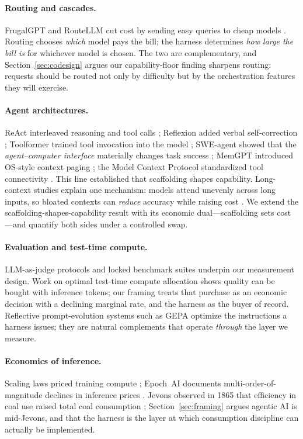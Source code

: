 \documentclass[11pt]{article}
\begin{document}
\paragraph{Routing and cascades.} FrugalGPT and RouteLLM cut cost by sending easy queries to cheap models \cite{frugalgpt,routellm}. Routing chooses \emph{which} model pays the bill; the harness determines \emph{how large the bill is} for whichever model is chosen. The two are complementary, and Section~\ref{sec:codesign} argues our capability-floor finding sharpens routing: requests should be routed not only by difficulty but by the orchestration features they will exercise.

\paragraph{Agent architectures.} ReAct interleaved reasoning and tool calls \cite{react}; Reflexion added verbal self-correction \cite{reflexion}; Toolformer trained tool invocation into the model \cite{toolformer}; SWE-agent showed that the \emph{agent--computer interface} materially changes task success \cite{sweagent}; MemGPT introduced OS-style context paging \cite{memgpt}; the Model Context Protocol standardized tool connectivity \cite{mcp}. This line established that scaffolding shapes capability. Long-context studies explain one mechanism: models attend unevenly across long inputs, so bloated contexts can \emph{reduce} accuracy while raising cost \cite{lost}. We extend the scaffolding-shapes-capability result with its economic dual---scaffolding sets cost---and quantify both sides under a controlled swap.

\paragraph{Evaluation and test-time compute.} LLM-as-judge protocols \cite{judge} and locked benchmark suites \cite{swebench} underpin our measurement design. Work on optimal test-time compute allocation \cite{snell} shows quality can be bought with inference tokens; our framing treats that purchase as an economic decision with a declining marginal rate, and the harness as the buyer of record. Reflective prompt-evolution systems such as GEPA \cite{gepa} optimize the instructions a harness issues; they are natural complements that operate \emph{through} the layer we measure.

\paragraph{Economics of inference.} Scaling laws priced training compute \cite{kaplan,chinchilla}; Epoch~AI documents multi-order-of-magnitude declines in inference prices \cite{epoch2025}. Jevons observed in 1865 that efficiency in coal use raised total coal consumption \cite{jevons1865}; Section~\ref{sec:framing} argues agentic AI is mid-Jevons, and that the harness is the layer at which consumption discipline can actually be implemented.
\end{document}
